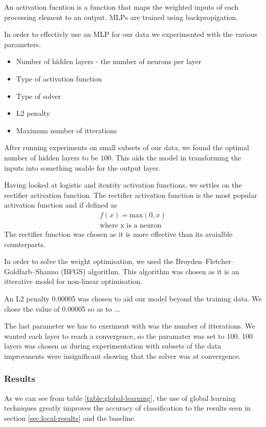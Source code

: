 \documentclass[bsc,frontabs,twoside,singlespacing,parskip,deptreport]{infthesis}     %
\begin{document}
An activation fucntion is a function that maps the weighted inputs of each processing element to an output.
MLPs are trained using backpropigation.


In order to effectivly use an MLP for our data we experimented with the various parameters.
\begin{itemize}
  \item Number of hidden layers - the number of neurons per layer
  \item Type of activation function
  \item Type of solver
  \item L2 penalty
  \item Maximum number of itterations
\end{itemize}

After running experiments on  small subsets of our data, we found the optimal number of hidden layers to be 100. 
This aids the model in transforming the inputs into something usable for the output layer.

Having looked at logistic and itentity activation functions, we settles on the rectifier activation function.
The rectifier activation function is the most popular activation function \cite{lecun2015deep} and if defined as
\begin{eqnarray}
  f(x) = \text{max}(0,x)\nonumber\\
  \text{where x is a neuron}\nonumber
\end{eqnarray}
The rectifier function was chosen as it is more effective than its avaialble counterparts\cite{glorot2011deep}.

In order to solve the weight optimisation, we used the Broyden–Fletcher–Goldfarb–Shanno (BFGS) algorithm.
This algorithm was chosen as it is an itterative model for non-linear optimisation.

An L2 penalty 0.00005 was chosen to aid our model beyond the training data.
We chose the value of 0.00005 so as to ...

The last parameter we has to exeriment with was the number of itterations.
We wanted each layer to reach a convergence, so the paramater was set to 100.
100 layers was chosen as during experimentation with subsets of the data improvments were insignificant showing that the solver was at convergence.


\subsubsection{Results}
As we can see from table \ref{table:global-learning},  the use of global learning techniques greatly improves the accuracy
of classification to the results seen in section \ref{sec:local-results} and the baseline.
\end{document}

